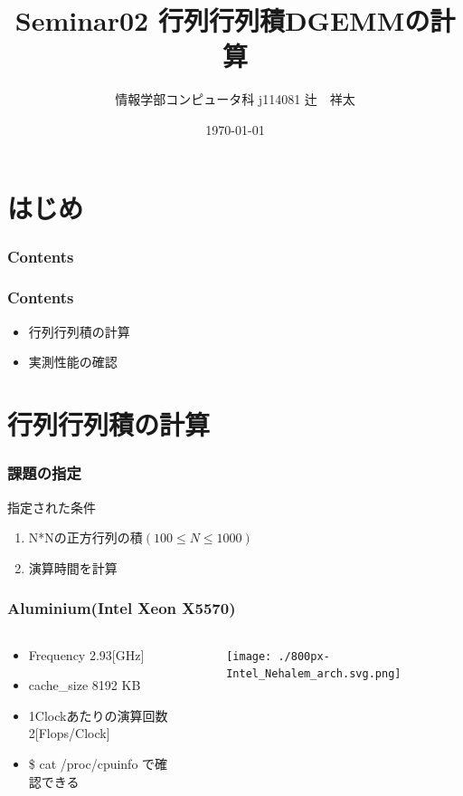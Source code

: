 \documentclass[dvipdfmx]{beamer}
\title[Seminar 2nd]{Seminar02 行列行列積DGEMMの計算}
\institute{Kogakuin University}
\author[Shota Tsuji]{情報学部コンピュータ科 j114081 辻　祥太}
\date{\AdvanceDate[1]\today}
\begin{document}
\section*{はじめ}
\begin{frame}
  \titlepage \end{frame} 
\begin{frame}[plain]
  \frametitle{Contents}
  \tableofcontents
\end{frame}

\begin{frame}
  \frametitle{Contents}
  \begin{itemize}
    \item 行列行列積の計算
    \item 実測性能の確認
  \end{itemize}
\end{frame}

\section{行列行列積の計算}
\begin{frame}
  \frametitle{課題の指定}
  指定された条件
  \begin{enumerate}
		\item N*Nの正方行列の積$(100\leq N \leq 1000)$
		\item 演算時間を計算
  \end{enumerate}
\end{frame}


\begin{frame}
	\frametitle{Aluminium(Intel Xeon X5570)}
	\begin{columns}
	\begin{column}{0.48\textwidth}
	\begin{itemize}
		\item Frequency 2.93[GHz]
		\item cache\_size 8192 KB
		\item 1Clockあたりの演算回数\\ 2[Flops/Clock]
	\end{itemize}

	\begin{itemize}
		\item \$ cat /proc/cpuinfo で確認できる
	\end{itemize}
	\end{column}

	\begin{column}{0.48\textwidth}
	\begin{figure}
	\texttt{[image: ./800px-Intel\_Nehalem\_arch.svg.png]}
	\end{figure}
	\end{column}
	\end{columns}
\end{frame}
\end{document}
